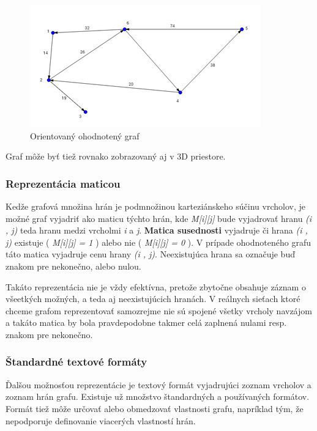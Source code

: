 \documentclass[12pt,twoside,slovak,a4paper]{article}
\begin{document}
 \begin{figure}[H]
 	 \caption{Orientovaný ohodnotený graf}
 	 \centering
	 \includegraphics{orientovany_ohodnoteny_small}
 \end{figure}
  Graf môže byť tiež rovnako zobrazovaný aj v 3D priestore.
  
 	\subsubsection{Reprezentácia maticou}
 	Kedže grafová množina hrán je podmnožinou karteziánskeho súčinu vrcholov, je možné graf vyjadriť ako maticu týchto hrán, kde \emph{M[i][j]} bude vyjadrovať hranu \emph{(i , j)} teda hranu medzi vrcholmi \emph{i} a \emph{j}.
 	\textbf{Matica susednosti} vyjadruje či hrana \emph{(i , j)} existuje ( \emph{M[i][j] = 1} ) alebo nie ( \emph{M[i][j] = 0} ).
 	V prípade ohodnoteného grafu táto matica vyjadruje cenu hrany \emph{(i , j)}. Neexistujúca hrana sa označuje buď znakom pre nekonečno, alebo nulou. 
 	
 	Takáto reprezentácia nie je vždy efektívna, pretože zbytočne obsahuje záznam o všeetkých možných, a teda aj neexistujúcich hranách. V reálnych sieťach ktoré chceme grafom reprezentovať samozrejme nie sú spojené všetky vrcholy navzájom a takáto matica by bola pravdepodobne takmer celá zaplnená nulami resp. znakom pre nekonečno.
 	
	
	\subsubsection{Štandardné textové formáty}
	Ďalšou možnosťou reprezentácie je textový formát vyjadrujúci zoznam vrcholov a zoznam hrán grafu. Existuje už množstvo štandardných a používaných formátov. Formát tiež môže určovať alebo obmedzovať vlastnosti grafu, napríklad tým, že nepodporuje definovanie viacerých vlastností hrán.
	
\end{document}
